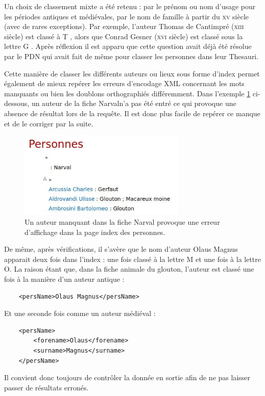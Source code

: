 \documentclass[a4paper,12pt,twoside]{book}
\begin{document}
Un choix de classement mixte a été retenu : par le prénom ou nom d'usage pour les périodes antiques et médiévales, par le nom de famille à partir du \textsc{xv}\ieme{} siècle (avec de rares exceptions). Par exemple, l'auteur Thomas de Cantimpré (\textsc{xiii}\ieme{} siècle) est classé à \og T \fg, alors que Conrad Gesner (\textsc{xvi}\ieme{} siècle) est classé sous la lettre \og G \fg. Après réflexion il est apparu que cette question avait déjà été résolue par le \acrshort{PDN} qui avait fait de même pour classer les personnes dans leur Thesauri.

Cette manière de classer les différents auteurs ou lieux sous forme d'index permet également de mieux repérer les erreurs d'encodage XML concernant les mots manquants ou bien les doublons orthographiés différemment. Dans l'exemple \ref{erreur} ci-dessous, un auteur de la fiche \og Narval\fg n'a pas été entré ce qui provoque une absence de résultat lors de la requête. Il est donc plus facile de repérer ce manque et de le corriger par la suite.

\begin{figure}[H]
    \centering
    \includegraphics[width=8cm]{img/partie_3/erreur_narval.JPG}
    \caption{Un auteur manquant dans la fiche Narval provoque une erreur d'affichage dans la page index des personnes.}
    \label{erreur}
\end{figure}

De même, après vérifications, il s'avère que le nom d'auteur Olaus Magnus apparait deux fois dans l'index : une fois classé à la lettre \og M \fg et une fois à la lettre \og O\fg. La raison étant que, dans la fiche animale du glouton, l'auteur est classé une fois à la manière d'un auteur antique : 
\begin{verbatim}
    <persName>Olaus Magnus</persName>
\end{verbatim}
Et une seconde fois comme un auteur médiéval :
\begin{verbatim}
    <persName>
        <forename>Olaus</forename>
        <surname>Magnus</surname>
    </persName>
\end{verbatim}
Il convient donc toujours de contrôler la donnée en sortie afin de ne pas laisser passer de résultats erronés.
\end{document}
